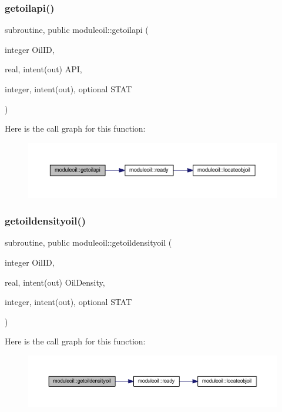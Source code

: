 \subsubsection{\texorpdfstring{getoilapi()}{getoilapi()}}
{\footnotesize\ttfamily subroutine, public moduleoil\+::getoilapi (\begin{DoxyParamCaption}\item[{integer}]{Oil\+ID,  }\item[{real, intent(out)}]{A\+PI,  }\item[{integer, intent(out), optional}]{S\+T\+AT }\end{DoxyParamCaption})}

Here is the call graph for this function\+:\nopagebreak
\begin{figure}[H]
\begin{center}
\leavevmode
\includegraphics[width=350pt]{namespacemoduleoil_abeaffbf39f30e3630cefa9fdf3a69e82_cgraph}
\end{center}
\end{figure}
\mbox{\label{namespacemoduleoil_a957aec9748df48f4722e500b1f600985}} 
\subsubsection{\texorpdfstring{getoildensityoil()}{getoildensityoil()}}
{\footnotesize\ttfamily subroutine, public moduleoil\+::getoildensityoil (\begin{DoxyParamCaption}\item[{integer}]{Oil\+ID,  }\item[{real, intent(out)}]{Oil\+Density,  }\item[{integer, intent(out), optional}]{S\+T\+AT }\end{DoxyParamCaption})}

Here is the call graph for this function\+:\nopagebreak
\begin{figure}[H]
\begin{center}
\leavevmode
\includegraphics[width=350pt]{namespacemoduleoil_a957aec9748df48f4722e500b1f600985_cgraph}
\end{center}
\end{figure}
\mbox{\label{namespacemoduleoil_ab0850c594da69306ab36555f8971e6e4}} 
